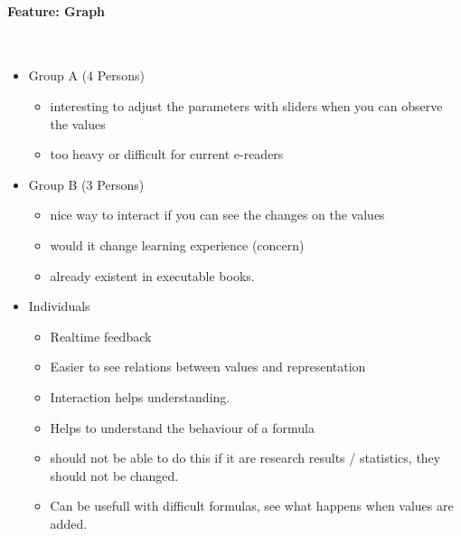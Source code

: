 \documentclass[main.tex]{subfiles}
\begin{document}
\paragraph{Feature: Graph}~
\begin{itemize}
	\item Group A (4 Persons)
		\begin{itemize}
			\item interesting to adjust the parameters with sliders when you can observe the values
			\item too heavy or difficult for current e-readers
		\end{itemize}
	\item Group B (3 Persons)
		\begin{itemize}
			\item nice way to interact if you can see the changes on the values
			\item would it change learning experience (concern)
			\item already existent in executable books.
		\end{itemize}
	\item Individuals
		\begin{itemize}
			\item Realtime feedback
			\item Easier to see relations between values and representation
			\item Interaction helps understanding.
			\item Helps to understand the behaviour of a formula
 			\item should not be able to do this if it are research results / statistics, they should not be changed. 
			\item Can be usefull with difficult formulas, see what happens when values are added.
		\end{itemize}
\end{itemize}
\end{document}
